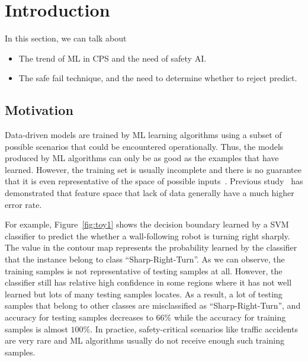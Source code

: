 \section{Introduction}
In this section, we can talk about 
\begin{itemize}
    \item The trend of ML  in CPS and the need of safety AI.
    \item The safe fail technique, and the need to determine whether to reject predict.
\end{itemize}





\subsection{Motivation}
Data-driven  models are trained by ML learning algorithms using a subset of possible scenarios that could be encountered operationally.   Thus,  the models produced by ML algorithms  can only be as good as the examples that have learned.  However, the training set is usually incomplete and there is no guarantee that it is even representative of the space of possible inputs~\cite{ISO16}.  Previous study~\cite{weiss1995learning} has demonstrated that  feature space that lack of data generally have a much higher error rate.    

For example, Figure~\ref{fig:toy1} shows the decision boundary learned by a SVM classifier to predict the whether a wall-following  robot is turning right sharply.  The value in the contour map represents the probability learned by the classifier that the instance belong to class ``Sharp-Right-Turn''.  As we can observe, the training samples is not  representative of testing samples at all. However, the classifier still has relative high confidence in some regions where it has not well learned but lots of many testing samples locates. As a result, a lot of testing samples that belong to other classes are misclassified as ``Sharp-Right-Turn'', and accuracy for testing samples decreases to $66\%$ while the accuracy for training samples is almost $100\%$. In practice, safety-critical scenarios like traffic accidents are very rare and ML algorithms usually do not receive enough such training samples.


